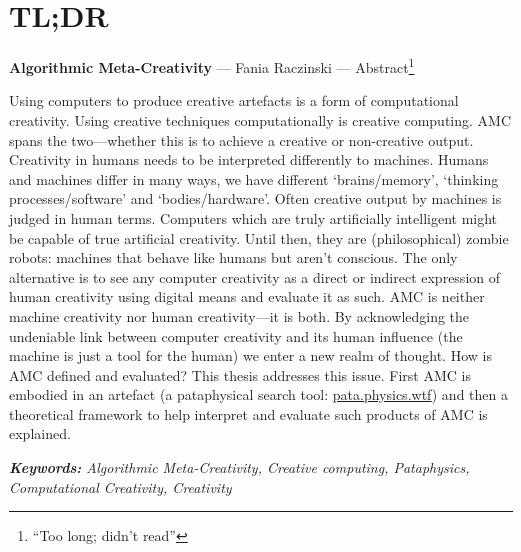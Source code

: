 
\pagestyle{empty}

\chapter{TL;DR}
\label{abstract}

{\Large \textbf{Algorithmic Meta-Creativity}} --- Fania Raczinski --- Abstract\footnote{``Too long; didn't read''}

\vspace{0.2cm}

Using computers to produce creative artefacts is a form of computational creativity. Using creative techniques computationally is creative computing. \ac{AMC} spans the two---whether this is to achieve a creative or non-creative output. Creativity in humans needs to be interpreted differently to machines. Humans and machines differ in many ways, we have different `brains/memory', `thinking processes/software' and `bodies/hardware'. Often creative output by machines is judged in human terms. Computers which are truly artificially intelligent might be capable of true artificial creativity. Until then, they are (philosophical) zombie robots: machines that behave like humans but aren't conscious. The only alternative is to see any computer creativity as a direct or indirect expression of human creativity using digital means and evaluate it as such. \ac{AMC} is neither machine creativity nor human creativity---it is both. By acknowledging the undeniable link between computer creativity and its human influence (the machine is just a tool for the human) we enter a new realm of thought. How is \ac{AMC} defined and evaluated? This thesis addresses this issue. First \ac{AMC} is embodied in an artefact (a pataphysical search tool: \url{pata.physics.wtf}) and then a theoretical framework to help interpret and evaluate such products of \ac{AMC} is explained.

\textit{\textbf{Keywords:} Algorithmic Meta-Creativity, Creative computing, Pataphysics, Computational Creativity, Creativity}

\cleardoublepage
